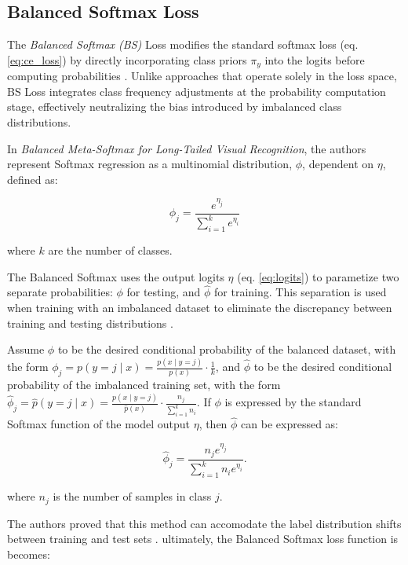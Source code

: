 \subsection{Balanced Softmax Loss}
\label{sec:bs_loss}
The \emph{Balanced Softmax (BS)} Loss modifies the standard softmax loss (eq. \eqref{eq:ce_loss}) by directly incorporating class priors $\pi_y$ into the logits before computing probabilities \cite{ren2020balancedmetasoftmaxlongtailedvisual}. Unlike approaches that operate solely in the loss space, BS Loss integrates class frequency adjustments at the probability computation stage, effectively neutralizing the bias introduced by imbalanced class distributions. 

In \emph{Balanced Meta-Softmax for Long-Tailed Visual Recognition}, the authors represent Softmax regression as a multinomial distribution, $\phi$, dependent on $\eta$, defined as:

\begin{equation}
    \phi_j = \frac{e^{\eta_j}}{\sum_{i=1}^{k}e^{\eta_i}}
\end{equation}

\noindent where $k$ are the number of classes.

The Balanced Softmax uses the output logits $\eta$ (eq. \eqref{eq:logits}) to parametize two separate probabilities: $\phi$ for testing, and $\hat{\phi}$ for training. This separation is used when training with an imbalanced dataset to eliminate the discrepancy between training and testing distributions \cite{ren2020balancedmetasoftmaxlongtailedvisual}.

Assume $\phi$ to be the desired conditional probability of the balanced dataset, with the form $\phi_j = p(y = j \mid x) = \frac{p(x \mid y=j)}{p(x)} \cdot \frac{1}{k}$, and $\hat{\phi}$ to be the desired conditional probability of the imbalanced training set, with the form $\hat{\phi}_j = \hat{p}(y = j \mid x) = \frac{p(x \mid y=j)}{\hat{p}(x)} \cdot \frac{n_j}{\sum_{i=1}^{k} n_i}$. If $\phi$ is expressed by the standard Softmax function of the model output $\eta$, then $\hat{\phi}$ can be expressed as:

\begin{equation}
    \hat{\phi}_j = \frac{n_j e^{\eta_j}}{\sum_{i=1}^{k} n_i e^{\eta_i}}.
\end{equation}

\noindent where $n_j$ is the number of samples in class $j$.

The authors proved that this method can accomodate the label distribution shifts between training and test sets \cite{ren2020balancedmetasoftmaxlongtailedvisual}. ultimately, the Balanced Softmax loss function is becomes:


